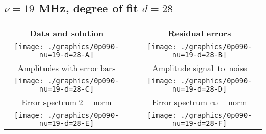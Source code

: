 

% 

\clearpage{}
\break{}

\subsection{$\nu = 19$ MHz, degree of fit $d = 28$}

\begin{table}[h]
    \begin{center}
        \begin{tabular}{ccc}
            Data and solution & \quad & Residual errors \\\hline
            \texttt{[image: ./graphics/0p090-nu=19-d=28-A]} &&
            \texttt{[image: ./graphics/0p090-nu=19-d=28-B]} \\[15pt]
            Amplitudes with error bars && Amplitude signal--to--noise \\\hline
            \texttt{[image: ./graphics/0p090-nu=19-d=28-C]} &&
            \texttt{[image: ./graphics/0p090-nu=19-d=28-D]} \\[15pt]
            Error spectrum $2-$norm && Error spectrum $\infty-$norm \\\hline
            \texttt{[image: ./graphics/0p090-nu=19-d=28-E]} &&
            \texttt{[image: ./graphics/0p090-nu=19-d=28-F]} \\[15pt]
        \end{tabular}
    \end{center}
\label{fig:elev=90, nu=19}
\end{table}



\endinput

